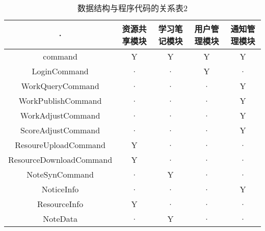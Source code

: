 \begin{table}[htbp]
\centering
\caption{数据结构与程序代码的关系表2} \label{tab:datastructure-module}
\begin{tabular}{|c|c|c|c|c|}
    \hline
    · &  资源共享模块 & 学习笔记模块 & 用户管理模块 & 通知管理模块  \\
    \hline
    command & Y & Y & Y & Y \\
    \hline
    LoginCommand & · & · & Y & · \\
    \hline
    WorkQueryCommand & · & · & · & Y \\
    \hline
    WorkPublishCommand & · & · & · & Y \\
    \hline
    WorkAdjustCommand & · & · & · & Y \\
    \hline
    ScoreAdjustCommand & · & · & · & Y \\
    \hline
    ResoureUploadCommand & Y & · & · & · \\
    \hline
    ResourceDownloadCommand & Y & · & · & · \\
    \hline
    NoteSynCommand & · & Y & · & · \\
    \hline
    NoticeInfo & · & · & · & Y \\
    \hline
    ResourceInfo & Y & · & · & · \\
    \hline
    NoteData & · & Y & · & · \\
    \hline
\end{tabular}
\end{table}

